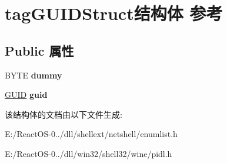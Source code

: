 \hypertarget{structtag_g_u_i_d_struct}{}\section{tag\+G\+U\+I\+D\+Struct结构体 参考}
\label{structtag_g_u_i_d_struct}
\subsection*{Public 属性}
\begin{DoxyCompactItemize}
\item 
\mbox{\label{structtag_g_u_i_d_struct_aeff32947556cdd409ffb5d29ef79b706}} 
B\+Y\+TE {\bfseries dummy}
\item 
\mbox{\label{structtag_g_u_i_d_struct_a1c3270d38e35db7a06eb1c0749b4845c}} 
\hyperlink{interface_g_u_i_d}{G\+U\+ID} {\bfseries guid}
\end{DoxyCompactItemize}


该结构体的文档由以下文件生成\+:\begin{DoxyCompactItemize}
\item 
E\+:/\+React\+O\+S-\/0../dll/shellext/netshell/enumlist.\+h\item 
E\+:/\+React\+O\+S-\/0../dll/win32/shell32/wine/pidl.\+h\end{DoxyCompactItemize}
